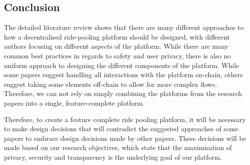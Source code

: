 \subsection{Conclusion}
The detailed literature review shows that there are many different approaches to how a decentralised ride-pooling platform should be designed, with different authors focusing on different aspects of the platform. While there are many common best practices in regards to safety and user privacy, there is also no uniform approach to designing the different components of the platform. While some papers suggest handling all interactions with the platform on-chain, others suggest taking some elements off-chain to allow for more complex flows. Therefore, we can not rely on simply combining the platforms from the research papers into a single, feature-complete platform.

Therefore, to create a feature complete ride pooling platform, it will be necessary to make design decisions that will contradict the suggested approaches of some papers to embrace design decisions made by other papers. These decisions will be made based on our research objectives, which state that the maximisation of privacy, security and transparency is the underlying goal of our platform.


